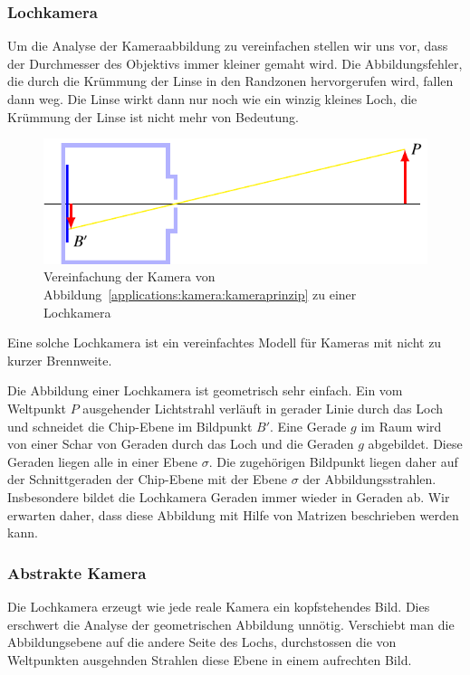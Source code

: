 \subsubsection{Lochkamera}
Um die Analyse der Kameraabbildung zu vereinfachen stellen wir uns vor,
dass der Durchmesser des Objektivs immer kleiner gemaht wird.
Die Abbildungsfehler, die durch die Krümmung der Linse in den Randzonen
hervorgerufen wird, fallen dann weg.
Die Linse wirkt dann nur noch wie ein winzig kleines Loch, die Krümmung
der Linse ist nicht mehr von Bedeutung.
\begin{figure}
\centering
\includegraphics{applications/kamera/lochkamera.pdf}
\caption{Vereinfachung der Kamera von
Abbildung~\ref{applications:kamera:kameraprinzip} zu einer Lochkamera
\label{applications:kamera:lochkamera}}
\end{figure}
Eine solche Lochkamera ist ein vereinfachtes Modell für Kameras mit
nicht zu kurzer Brennweite.

Die Abbildung einer Lochkamera ist geometrisch sehr einfach.
Ein vom Weltpunkt $P$ ausgehender Lichtstrahl verläuft in gerader
Linie durch das Loch und schneidet die Chip-Ebene im Bildpunkt $B'$.
Eine Gerade $g$ im Raum wird von einer Schar von Geraden durch das Loch und
die Geraden $g$ abgebildet.
Diese Geraden liegen alle in einer Ebene $\sigma$.
Die zugehörigen Bildpunkt liegen daher auf der Schnittgeraden der
Chip-Ebene mit der Ebene $\sigma$ der Abbildungsstrahlen.
Insbesondere bildet die Lochkamera Geraden immer wieder in Geraden ab.
Wir erwarten daher, dass diese Abbildung mit Hilfe von Matrizen
beschrieben werden kann.

\subsubsection{Abstrakte Kamera}
Die Lochkamera erzeugt wie jede reale Kamera ein kopfstehendes Bild.
Dies erschwert die Analyse der geometrischen Abbildung unnötig.
Verschiebt man die Abbildungsebene auf die andere Seite des Lochs,
durchstossen die von Weltpunkten ausgehnden Strahlen diese Ebene in
einem aufrechten Bild.

